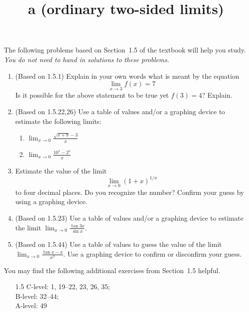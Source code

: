 \documentclass{article}
\title{\commonPSTitleZeroOneFive a (ordinary two-sided limits)}
\author{\commonAuthor}
\date{\commonDateZeroOneFive}
\newcommand{\ds}{\displaystyle}
\begin{document}
\maketitle
\thispagestyle{empty}

\noindent
The following problems based on Section~1.5 of the textbook will help
you study.  \emph{You do not need to hand in solutions to these
  problems.}
\begin{enumerate}
\item (Based on 1.5.1) Explain in your own words what is meant by the
  equation
  \begin{equation*}
    \lim_{x\to 3} f(x) = 7
  \end{equation*}
  Is it possible for the above statement to be true yet $f(3)=4$?
  Explain. 
\item (Based on 1.5.22,26) Use a table of values and/or a graphing device
  to estimate the following limits:
  \begin{multicols}{2}
  \begin{enumerate}
  \item $\ds \lim_{x\to 0} \frac{\sqrt{x+9}-3}{x}$
  \item $\ds \lim_{x\to 0} \frac{10^x-2^x}{x}$
  \end{enumerate}
  \end{multicols}
\item Estimate the value of the limit
  \begin{equation*}
    \lim_{x\to 0} (1+x)^{1/x}
  \end{equation*}
  to four decimal places.  Do you recognize the number?  Confirm your
  guess by using a graphing device.
\item (Based on 1.5.23) Use a table of values and/or a graphing device
  to estimate the limit $\ds \lim_{x\to 0} \frac{\tan 3x}{\sin x}$.
\item (Based on 1.5.44) Use a table of values to guess the value of
  the limit $\displaystyle\lim_{x\to 0} \frac{\tan x - x}{x^3}$.  Use
  a graphing device to confirm or disconfirm your guess.
\end{enumerate}

\noindent
You may find the following additional exercises from Section~1.5 helpful.
\begin{itemize}
\item[1.5] 
  C-level: 1, 19--22, 23, 26, 35; \\
  B-level: 32--44; \\
  A-level: 49
\end{itemize}
\end{document}
